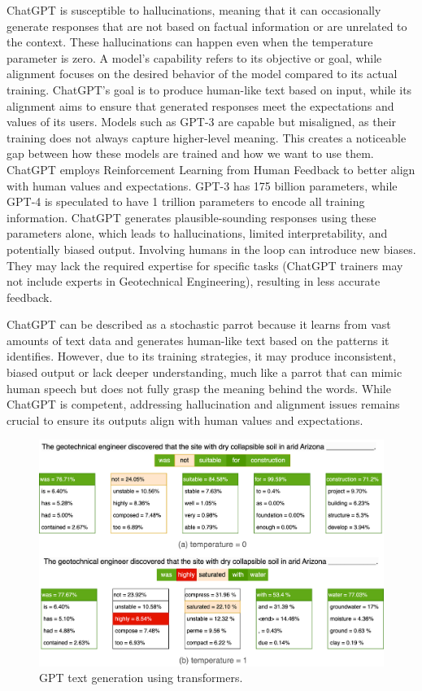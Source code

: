 \documentclass[12pt]{article}
\begin{document}
ChatGPT is susceptible to hallucinations, meaning that it can occasionally generate responses that are not based on factual information or are unrelated to the context. These hallucinations can happen even when the temperature parameter is zero. A model's capability refers to its objective or goal, while alignment focuses on the desired behavior of the model compared to its actual training. ChatGPT's goal is to produce human-like text based on input, while its alignment aims to ensure that generated responses meet the expectations and values of its users. Models such as GPT-3 are capable but misaligned, as their training does not always capture higher-level meaning. This creates a noticeable gap between how these models are trained and how we want to use them. ChatGPT employs Reinforcement Learning from Human Feedback to better align with human values and expectations. GPT-3 has 175 billion parameters, while GPT-4 \parencite{bubeck2023sparks} is speculated to have 1 trillion parameters to encode all training information. ChatGPT generates plausible-sounding responses using these parameters alone, which leads to hallucinations, limited interpretability, and potentially biased output. Involving humans in the loop can introduce new biases. They may lack the required expertise for specific tasks (ChatGPT trainers may not include experts in Geotechnical Engineering), resulting in less accurate feedback.

ChatGPT can be described as a stochastic parrot because it learns from vast amounts of text data and generates human-like text based on the patterns it identifies. However, due to its training strategies, it may produce inconsistent, biased output or lack deeper understanding, much like a parrot that can mimic human speech but does not fully grasp the meaning behind the words. While ChatGPT is competent, addressing hallucination and alignment issues remains crucial to ensure its outputs align with human values and expectations.

\begin{figure}[ht]
    \centering
    \includegraphics[width = 0.8\linewidth]{figs/transformers.png}
    \caption{GPT text generation using transformers.}
    \label{fig:Transformers}
\end{figure}
\end{document}
